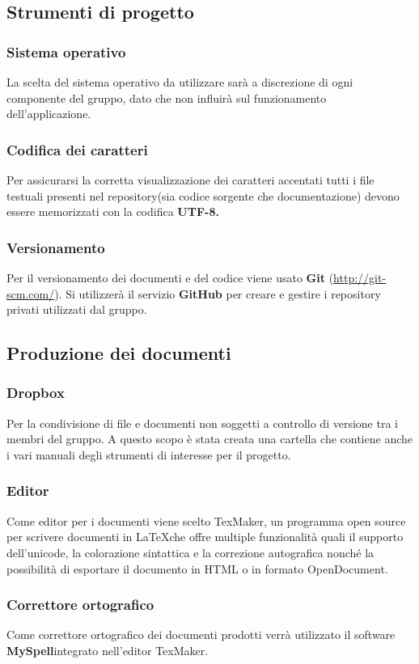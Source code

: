 \documentclass[a4paper,11pt]{article}
\begin{document}
		
		
		\subsection{Strumenti di progetto} \label{s:strum} 	
	
		\subsubsection{Sistema operativo}
		La scelta del sistema operativo da utilizzare sarà a discrezione di ogni componente del gruppo, dato che non influirà sul funzionamento dell'applicazione.
		\subsubsection{Codifica dei caratteri}
		Per assicurarsi la corretta visualizzazione dei caratteri accentati tutti i file testuali presenti nel repository\addglos(sia codice sorgente che documentazione) devono essere memorizzati con la codifica\textbf{ UTF-8\addglos.}
		\subsubsection{Versionamento}
		Per il versionamento dei documenti e del codice viene usato \textbf{Git\addglos} (\url{http://git-scm.com/}). Si utilizzerà il servizio \textbf{GitHub\addglos} per creare e gestire i repository privati utilizzati dal gruppo.
			
	\subsection{Produzione dei documenti}
	
	\subsubsection{Dropbox}
	Per la condivisione di file e documenti non soggetti a controllo di versione tra i membri del gruppo. A questo scopo è stata creata una cartella che contiene anche i vari  manuali degli strumenti di interesse per il progetto.
	\subsubsection{Editor}
	Come editor per i documenti viene scelto TexMaker\addglos, un programma open source per scrivere documenti in \LaTeX  che offre multiple funzionalità quali il supporto dell'unicode, la colorazione sintattica e la correzione autografica nonché la possibilità di esportare il documento in HTML o in formato OpenDocument\addglos.
	\subsubsection{Correttore ortografico}
	Come correttore ortografico dei documenti prodotti verrà utilizzato il software \textbf{MySpell}\addglos integrato nell'editor TexMaker.
	\newpage
	
		
	
\end{document}
